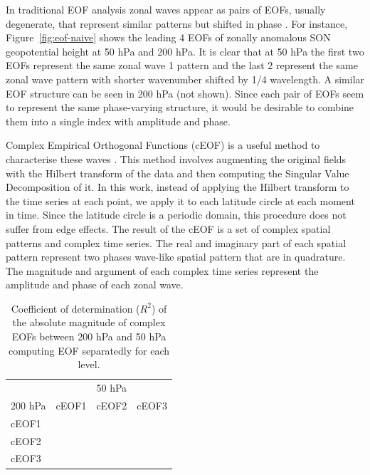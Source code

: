 \documentclass[smallextended]{svjour3}       %
\begin{document}
In traditional EOF analysis zonal waves appear as pairs of EOFs, usually degenerate, that represent similar patterns but shifted in phase \citep{horel1984}. For instance, Figure~\ref{fig:eof-naive} shows the leading 4 EOFs of zonally anomalous SON geopotential height at 50 hPa and 200 hPa. It is clear that at 50 hPa the first two EOFs represent the same zonal wave 1 pattern and the last 2 represent the same zonal wave pattern with shorter wavenumber shifted by 1/4 wavelength. A similar EOF structure can be seen in 200 hPa (not shown). Since each pair of EOFs seem to represent the same phase-varying structure, it would be desirable to combine them into a single index with amplitude and phase.

Complex Empirical Orthogonal Functions (cEOF) is a useful method to characterise these waves \citep{horel1984}. This method involves augmenting the original fields with the Hilbert transform of the data and then computing the Singular Value Decomposition of it. In this work, instead of applying the Hilbert transform to the time series at each point, we apply it to each latitude circle at each moment in time. Since the latitude circle is a periodic domain, this procedure does not suffer from edge effects. The result of the cEOF is a set of complex spatial patterns and complex time series. The real and imaginary part of each spatial pattern represent two phases wave-like spatial pattern that are in quadrature. The magnitude and argument of each complex time series represent the amplitude and phase of each zonal wave.

\begin{table}

\caption{\label{tab:corr-ceof-splitted}Coefficient of determination ($R^2$) of the absolute magnitude of complex EOFs between 200 hPa and 50 hPa computing EOF separatedly for each level.}
\centering
\begin{tabular}[t]{l>{}r>{}r>{}r}
\toprule
\multicolumn{1}{c}{} & \multicolumn{3}{c}{50 hPa} \\
\cmidrule(l{3pt}r{3pt}){2-4}
200 hPa & cEOF1 & cEOF2 & cEOF3\\
\midrule
cEOF1 & \cellcolor[HTML]{E1C0BB}{\textcolor{black}{0.28}} & \cellcolor[HTML]{FDFCFC}{\textcolor{black}{0.01}} & \cellcolor[HTML]{FDFAFA}{\textcolor{black}{0.02}}\\
cEOF2 & \cellcolor[HTML]{FFFFFF}{\textcolor{black}{0.00}} & \cellcolor[HTML]{BB7A73}{\textcolor{white}{0.60}} & \cellcolor[HTML]{FDFAFA}{\textcolor{black}{0.02}}\\
cEOF3 & \cellcolor[HTML]{FFFFFF}{\textcolor{black}{0.00}} & \cellcolor[HTML]{FFFFFF}{\textcolor{black}{0.00}} & \cellcolor[HTML]{FDFAFA}{\textcolor{black}{0.02}}\\
\bottomrule
\end{tabular}
\end{table}
\end{document}
